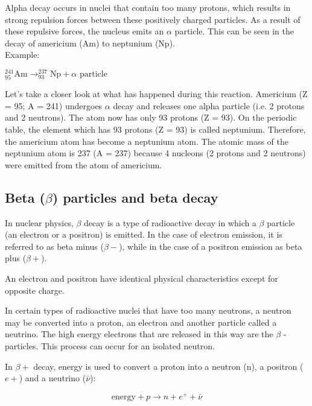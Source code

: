 Alpha decay occurs in nuclei that contain too many protons, which results in strong repulsion forces between these positively charged particles. As a result of these repulsive forces, the nucleus emits an $\alpha$ particle. This can be seen in the decay of americium (Am) to neptunium (Np).\\

Example:

\begin{center}
$^{241}_{95}\text{Am} \rightarrow ^{237}_{93}\text{Np} + \alpha \text{ particle}$
\end{center}

Let's take a closer look at what has happened during this reaction. Americium (Z = 95; A = 241) undergoes $\alpha$ decay and releases one alpha particle (i.e. 2 protons and 2 neutrons). The atom now has only 93 protons (Z = 93). On the periodic table, the element which has 93 protons (Z = 93) is called neptunium. Therefore, the americium atom has become a neptunium atom. The atomic mass of the neptunium atom is 237 (A = 237) because 4 nucleons (2 protons and 2 neutrons) were emitted from the atom of americium.

\subsection{Beta ($\beta$) particles and beta decay}
In nuclear physics, $\beta$ decay is a type of radioactive decay in which a $\beta$ particle (an electron or a positron) is emitted. In the case of electron emission, it is referred to as beta minus ($\beta -$), while in the case of a positron emission as beta plus ($\beta +$).

An electron and positron have identical physical characteristics except for opposite charge.

In certain types of radioactive nuclei that have too many neutrons, a neutron may be converted into a proton, an electron and another particle called a neutrino. The high energy electrons that are released in this way are the $\beta$ - particles. This process can occur for an isolated neutron.

In $\beta +$ decay, energy is used to convert a proton into a neutron (n), a
positron ($e+$) and a neutrino ($\bar{\nu}$):

\begin{equation*}
\mbox{energy} + p \rightarrow n + e^+ + {\bar{\nu}}
\end{equation*}


